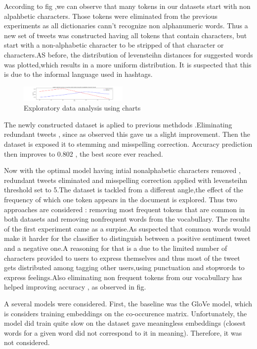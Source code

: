 \documentclass[10pt,conference,compsocconf]{IEEEtran}
\begin{document}
According to fig ,we can observe that many tokens in our datasets start with non alpahbetic characters. Those tokens were eliminated from the previous experiments as all dictionaries cann't recognize non alphanumeric words. Thus  a new set of tweets was constructed having all tokens that contain characters, but start with a non-alphabetic character to be stripped of that character or characters.AS before, the distribution of levensteihn distances for suggested words was plotted,which results in a more uniform distribution. It is suspected that this is due to the informal language used in hashtags. 
\begin{figure}[!htb]
	\centering \includegraphics[width=200px]{../plots/filtered_text.png}
	\caption{Exploratory data analysis using charts}
	\label{fig:data}
\end{figure}
The newly constructed dataset is aplied to previous methdods .Eliminating redundant tweets , since as observed this gave us a slight improvement. Then the dataset is exposed it to stemming and misspelling correction. Accuracy prediction then improves to 0.802 , the best score ever reached.

Now with the optimal model having intial nonalphabetic characters removed , redundant tweets eliminated and misspelling correction applied with levensteihn threshold set to 5.The dataset is tackled from a different angle,the effect of the frequency of which one token appears in the document is explored. Thus two approaches are considered : removing most frequent tokens that are common in both datasets and removing nonfrequent words from the vocabullary. The results of the first experiment came as a surpise.As suspected that common words would make it harder for the classifier to distinguish between a positive sentiment tweet and a negative one.A reasoning for that is a due to the limited number of characters provided to users to express themselves and thus most of the tweet gets distributed among tagging other users,using punctuation and stopwords to express feelings.Also eliminating non frequent tokens from our vocabullary has helped improving accuracy , as observed in fig.    

A several models were considered.
First, the baseline was the GloVe \cite{glove} model, which is considers training embeddings on the co-occurence matrix.
Unfortunately, the model did train quite slow on the dataset gave meaningless embeddings (closest words for a given word did not correspond to it in meaning).
Therefore, it was not considered.
\end{document}
